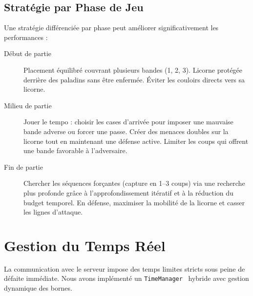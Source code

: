 \documentclass[12pt,a4paper]{article}
\begin{document}
\subsection{Stratégie par Phase de Jeu}
Une stratégie différenciée par phase peut améliorer significativement les performances :
\begin{description}
    \item[Début de partie] Placement équilibré couvrant plusieurs bandes (1, 2, 3). Licorne protégée derrière des paladins sans être enfermée. Éviter les couloirs directs vers sa licorne.
    \item[Milieu de partie] Jouer le tempo : choisir les cases d'arrivée pour imposer une mauvaise bande adverse ou forcer une passe. Créer des menaces doubles sur la licorne tout en maintenant une défense active. Limiter les coups qui offrent une bande favorable à l'adversaire.
    \item[Fin de partie] Chercher les séquences forçantes (capture en 1--3 coups) via une recherche plus profonde grâce à l'approfondissement itératif et à la réduction du budget temporel. En défense, maximiser la mobilité de la licorne et casser les lignes d'attaque.
\end{description}






\section{Gestion du Temps Réel}
\label{sec-time}
La communication avec le serveur impose des temps limites stricts sous peine de défaite immédiate. Nous avons implémenté un \texttt{TimeManager}~\cite{cp_time} hybride avec gestion dynamique des bornes.
\end{document}
